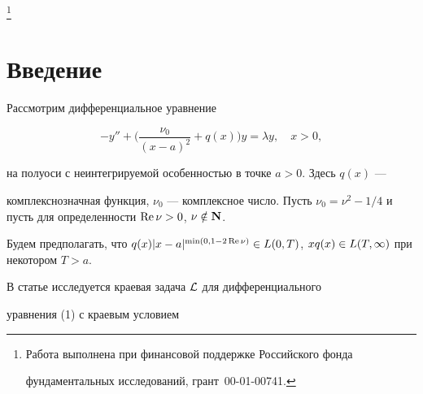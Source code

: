 \thanks{Работа выполнена при финансовой поддержке Российского фонда


фундаментальных исследований, грант \No\,00-01-00741.}





\date{}




\pagestyle{plain} %







\maketitle


\label{begin}











\section{Введение}





Рассмотрим дифференциальное уравнение


\begin{equation}


-y''+\bigg(\frac{\nu_0}{(x-a)^2}+q(x)\bigg)y=\lambda y,\quad x>0,


\end{equation}


на полуоси с неинтегрируемой особенностью в точке $a>0$. Здесь $q(x)$ ---


комплекснозначная функция, $\nu_0$ --- комплексное число. Пусть $\nu_0=


\nu^2-1/4$ и пусть для определенности $\re\nu>0$, $\nu\notin \bold N$.


Будем предполагать, что $q(x)|x-a|^{\min(0,1-2\re\nu)}


\in L(0,T)$, $xq(x)\in L(T,\iy)$ при некотором $T>a$.





В статье исследуется краевая задача ${\cal L}$ для дифференциального


уравнения (1) с краевым условием


